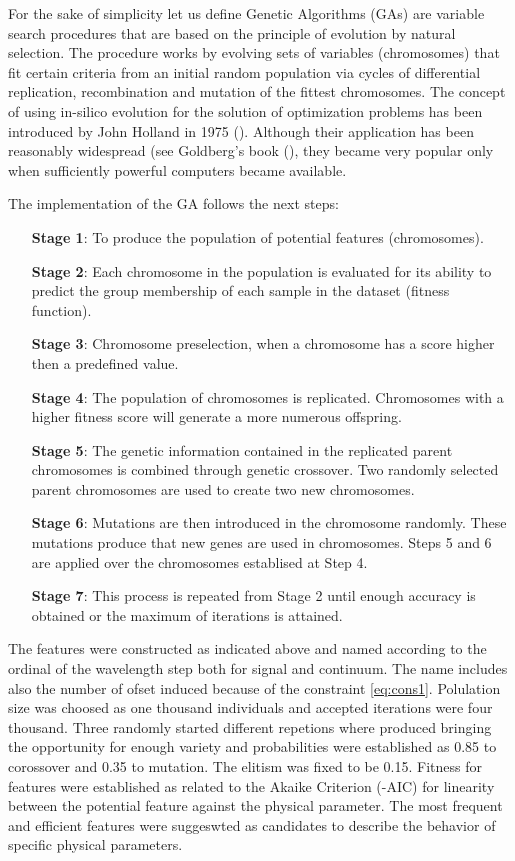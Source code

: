 {{ For the sake of simplicity let us define Genetic Algorithms (GAs)
  are variable search procedures that are based on the principle of
  evolution by natural selection. The procedure works by evolving sets
  of variables (chromosomes) that fit certain criteria from an initial
  random population via cycles of differential replication,
  recombination and mutation of the fittest chromosomes. The concept
  of using in-silico evolution for the solution of optimization
  problems has been introduced by John Holland in 1975
  (\cite{holland1975adaptation}). Although their application has been
  reasonably widespread (see Goldberg\textquoteright s book
  (\cite{goldberg1989genetic}), they became very popular only when
  sufficiently powerful computers became available.  }

{
The implementation of the GA follows the next steps:
\begin{itemize}
 \item [\textbf{Stage 1}:]{To produce the population of potential features (chromosomes).}
 \item [\textbf{Stage 2}:]{Each chromosome in the population is evaluated for its ability to
predict the group membership of each sample in the dataset (fitness function).}
 \item [\textbf{Stage 3}:]{Chromosome preselection, when a chromosome has 
 a score higher then a predefined value.}
 \item [\textbf{Stage 4}:]{The population of chromosomes is replicated. 
 Chromosomes with a higher fitness score will 
 generate a more numerous offspring.}
 \item [\textbf{Stage 5}:]{The genetic information contained in the replicated parent
chromosomes is combined through genetic crossover. Two randomly selected
parent chromosomes are used to create two new chromosomes.}
 \item [\textbf{Stage 6}:]{Mutations are then introduced in the chromosome randomly. 
 These mutations produce that new genes are used in chromosomes.
 Steps 5 and 6 are applied over the chromosomes establised at Step 4.}
  \item [\textbf{Stage 7}:]{This process is repeated from Stage 2 until 
  enough accuracy is obtained or the maximum of iterations is attained.}
\end{itemize}

The features were constructed as indicated above and named according
to the ordinal of the wavelength step both for signal and
continuum. The name includes also the number of ofset induced because
of the constraint \ref{eq:cons1}.  Polulation size was choosed as one
thousand individuals and accepted iterations were four thousand.
Three randomly started different repetions where produced bringing the
opportunity for enough variety and probabilities were established as
0.85 to corossover and 0.35 to mutation. The elitism was fixed to be
0.15.  Fitness for features were established as related to the Akaike
Criterion (-AIC) for linearity between the potential feature against
the physical parameter.  The most frequent and efficient features were
suggeswted as candidates to describe the behavior of specific physical
parameters.

}}
